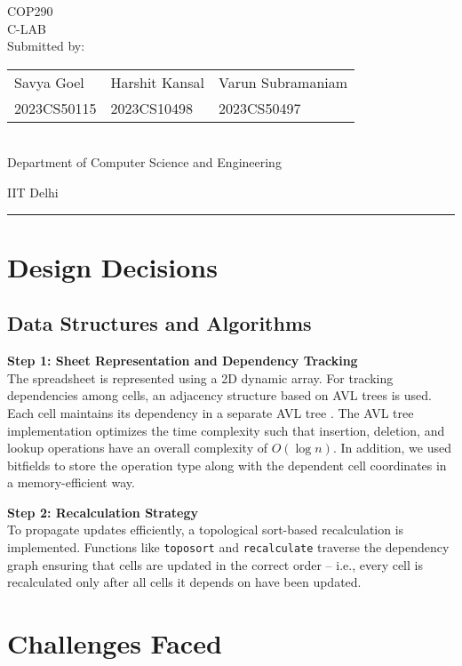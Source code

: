 \documentclass[12pt,letterpaper,onecolumn]{exam}
\begin{document}
\begingroup
    \centering
    \LARGE COP290\\
    \LARGE C-LAB\\[1em]
    \large Submitted by:\\[0.8em]
    \begin{tabular}{>{\centering\arraybackslash}m{4cm} >{\centering\arraybackslash}m{4cm} >{\centering\arraybackslash}m{5cm}}
        Savya Goel & Harshit Kansal & Varun Subramaniam \\
        2023CS50115 & 2023CS10498 & 2023CS50497
    \end{tabular}\\[1em]
    \large Department of Computer Science and Engineering\par
    \large IIT Delhi\par
\endgroup

\rule{\textwidth}{0.4pt}

\section{Design Decisions}

\subsection{Data Structures and Algorithms}

\noindent \textbf{Step 1: Sheet Representation and Dependency Tracking}\\
The spreadsheet is represented using a 2D dynamic array. For tracking dependencies among cells, an adjacency structure based on AVL trees is used. Each cell maintains its dependency in a separate AVL tree . The AVL tree implementation optimizes the time complexity such that insertion, deletion, and lookup operations have an overall complexity of \(O(\log n)\). In addition, we used bitfields to store the operation type along with the dependent cell coordinates in a memory-efficient way.

\vspace{0.3cm}

\noindent \textbf{Step 2: Recalculation Strategy}\\
To propagate updates efficiently, a topological sort-based recalculation is implemented. Functions like \texttt{toposort} and \texttt{recalculate} traverse the dependency graph ensuring that cells are updated in the correct order -- i.e., every cell is recalculated only after all cells it depends on have been updated. 

\section{Challenges Faced}
\end{document}
